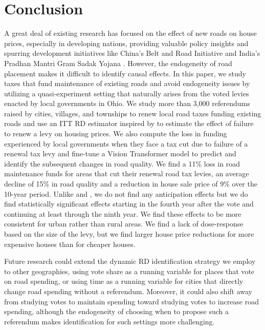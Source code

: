 \section{Conclusion} \label{sec:conclusion}

A great deal of existing research has focused on the effect of new roads on house prices, especially in developing nations, providing valuable policy insights and spurring development initiatives like China’s Belt and Road Initiative \citep{huang2016understanding} and India’s Pradhan Mantri Gram Sadak Yojana \citep{asher2020}. However, the endogeneity of road placement makes it difficult to identify causal effects. In this paper, we study taxes that fund maintenance of existing roads and avoid endogeneity issues by utilizing a quasi-experiment setting that naturally arises from the voted levies enacted by local governments in Ohio. We study more than 3,000 referendums raised by cities, villages, and townships to renew local road taxes funding existing roads and use an ITT RD estimator inspired by \cite{cellini2010value} to estimate the effect of failure to renew a levy on housing prices. We also compute the loss in funding experienced by local governments when they face a tax cut due to failure of a renewal tax levy and fine-tune a Vision Transformer model to predict and identify the subsequent changes in road quality. We find a 11\% loss in road maintenance funds for areas that cut their renewal road tax levies, an average decline of 15\% in road quality and a reduction in house sale price of 9\% over the 10-year period. Unlike \cite{beenstock2016hedonic} and \cite{diao2017spatial}, we do not find any anticipation effects but we do find statistically significant effects starting in the fourth year after the vote and continuing at least through the ninth year. We find these effects to be more consistent for urban rather than rural areas. We find a lack of dose-response based on the size of the levy, but we find larger house price reductions for more expensive houses than for cheaper houses.  

Future research could extend the dynamic RD identification strategy we employ to other geographies, using vote share as a running variable for places that vote on road spending, or using time as a running variable for cities that directly change road spending without a referendum. Moreover, it could also shift away from studying votes to maintain spending toward studying votes to increase road spending, although the endogeneity of choosing when to propose such a referendum makes identification for such settings more challenging.


